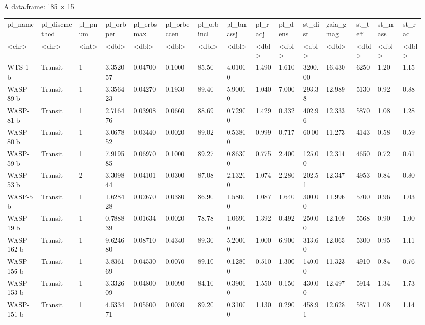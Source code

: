 \documentclass[11pt]{article}
\begin{document}
    A data.frame: 185 × 15
\begin{tabular}{lllllllllllllll}
 pl\_name & pl\_discmethod & pl\_pnum & pl\_orbper & pl\_orbsmax & pl\_orbeccen & pl\_orbincl & pl\_bmassj & pl\_radj & pl\_dens & st\_dist & gaia\_gmag & st\_teff & st\_mass & st\_rad\\
 <chr> & <chr> & <int> & <dbl> & <dbl> & <dbl> & <dbl> & <dbl> & <dbl> & <dbl> & <dbl> & <dbl> & <dbl> & <dbl> & <dbl>\\
\hline
	 WTS-1 b      & Transit & 1 &  3.352057 & 0.04700 & 0.1000 & 85.50 & 4.01000 & 1.490 & 1.610 & 3200.00 & 16.430 & 6250 & 1.20 & 1.15\\
	 WASP-89 b    & Transit & 1 &  3.356423 & 0.04270 & 0.1930 & 89.40 & 5.90000 & 1.040 & 7.000 &  293.38 & 12.989 & 5130 & 0.92 & 0.88\\
	 WASP-81 b    & Transit & 1 &  2.716476 & 0.03908 & 0.0660 & 88.69 & 0.72900 & 1.429 & 0.332 &  402.96 & 12.333 & 5870 & 1.08 & 1.28\\
	 WASP-80 b    & Transit & 1 &  3.067852 & 0.03440 & 0.0020 & 89.02 & 0.53800 & 0.999 & 0.717 &   60.00 & 11.273 & 4143 & 0.58 & 0.59\\
	 WASP-59 b    & Transit & 1 &  7.919585 & 0.06970 & 0.1000 & 89.27 & 0.86300 & 0.775 & 2.400 &  125.00 & 12.314 & 4650 & 0.72 & 0.61\\
	 WASP-53 b    & Transit & 2 &  3.309844 & 0.04101 & 0.0300 & 87.08 & 2.13200 & 1.074 & 2.280 &  202.51 & 12.347 & 4953 & 0.84 & 0.80\\
	 WASP-5 b     & Transit & 1 &  1.628428 & 0.02670 & 0.0380 & 86.90 & 1.58000 & 1.087 & 1.640 &  300.00 & 11.996 & 5700 & 0.96 & 1.03\\
	 WASP-19 b    & Transit & 1 &  0.788839 & 0.01634 & 0.0020 & 78.78 & 1.06900 & 1.392 & 0.492 &  250.00 & 12.109 & 5568 & 0.90 & 1.00\\
	 WASP-162 b   & Transit & 1 &  9.624680 & 0.08710 & 0.4340 & 89.30 & 5.20000 & 1.000 & 6.900 &  313.60 & 12.065 & 5300 & 0.95 & 1.11\\
	 WASP-156 b   & Transit & 1 &  3.836169 & 0.04530 & 0.0070 & 89.10 & 0.12800 & 0.510 & 1.300 &  140.00 & 11.323 & 4910 & 0.84 & 0.76\\
	 WASP-153 b   & Transit & 1 &  3.332609 & 0.04800 & 0.0090 & 84.10 & 0.39000 & 1.550 & 0.150 &  430.00 & 12.497 & 5914 & 1.34 & 1.73\\
	 WASP-151 b   & Transit & 1 &  4.533471 & 0.05500 & 0.0030 & 89.20 & 0.31000 & 1.130 & 0.290 &  458.91 & 12.628 & 5871 & 1.08 & 1.14\\

\end{tabular}
\end{document}
